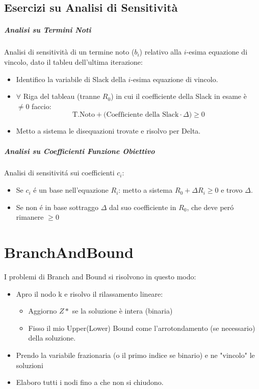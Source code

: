\documentclass[12pt, a4paper, openany]{book}
\begin{document}
\section{Esercizi su Analisi di Sensitività}
\paragraph{Analisi su Termini Noti}
Analisi di sensitività di un termine noto ($b_i$) relativo alla $i$-esima equazione di vincolo,
dato il tableu dell'ultima iterazione:
\begin{itemize}
	\item Identifico la variabile di Slack della $i$-esima equazione di vincolo.
	\item $\forall$ Riga del tableau \small{(tranne $R_0$)} in cui il coefficiente della Slack in esame è $\neq 0$ faccio:
	\[\text{T.Noto} + \text{(Coefficiente della Slack} \cdot \Delta ) \geq 0\]
	\item Metto a sistema le disequazioni trovate e risolvo per Delta.
\end{itemize}

\paragraph{Analisi su Coefficienti Funzione Obiettivo}
Analisi di sensitivitá sui coefficienti $c_i$:
\begin{itemize}
	\item Se $c_i$ é un base nell'equazione $R_i$: metto a sistema $R_0 + \Delta R_i \geq 0$ e trovo $\Delta$.
	\item Se non é in base sottraggo $\Delta$ dal suo coefficiente in $R_0$, che deve peró rimanere $\geq 0$ 
\end{itemize}

\chapter{BranchAndBound}
I problemi di Branch and Bound si risolvono in questo modo:

\begin{itemize}
	\item Apro il nodo k e risolvo il rilassamento lineare:
	\begin{itemize}
		\item Aggiorno $Z*$ se la soluzione è intera (binaria)
		\item Fisso il mio Upper(Lower) Bound come l'arrotondamento (se necessario) della soluzione.
	\end{itemize} 
	\item Prendo la variabile frazionaria (o il primo indice se binario) e ne "vincolo" le soluzioni
	\item Elaboro tutti i nodi fino a che non si chiudono.
\end{itemize}
\end{document}
